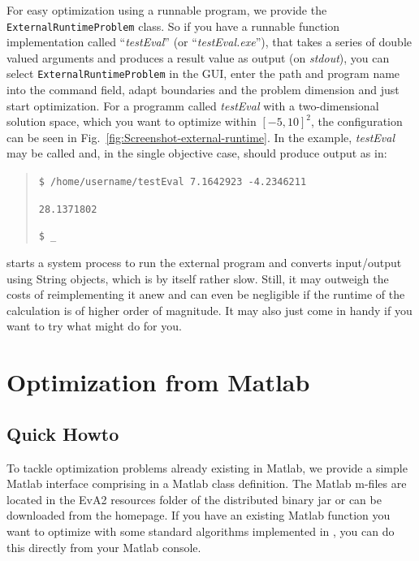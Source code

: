 For easy optimization using a runnable program, we provide the \texttt{ExternalRuntimeProblem}
class. So if you have a runnable function implementation called ``\emph{testEval}''
(or ``\emph{testEval.exe}''), that takes a series of double valued
arguments and produces a result value as output (on \textit{stdout}),
you can select \texttt{ExternalRuntimeProblem} in the GUI, enter the
path and program name into the command field, adapt boundaries and
the problem dimension and just start optimization. For a programm
called \textit{testEval} with a two-dimensional solution space, which
you want to optimize within $[-5,10]^{2}$, the configuration can
be seen in Fig.~\ref{fig:Screenshot-external-runtime}. In the example,
\textit{testEval} may be called and, in the single objective case,
should produce output as in:
\begin{quotation}
\begin{flushleft}
\texttt{\$ /home/username/testEval 7.1642923 -4.2346211}
\par\end{flushleft}

\begin{flushleft}
\texttt{28.1371802}
\par\end{flushleft}

\begin{flushleft}
\texttt{\$ \_}
\par\end{flushleft}
\end{quotation}
 starts a system process to run the external program and
converts input/output using String objects, which is by itself rather
slow. Still, it may outweigh the costs of reimplementing it anew and
can even be negligible if the runtime of the calculation is of higher
order of magnitude. It may also just come in handy if you want to
try what  might do for you.


\section{Optimization from Matlab\label{sub:Optimization-from-Matlab}}


\subsection{Quick Howto\label{sub:JEInterface-Quick-Intro}}

To tackle optimization problems already existing in Matlab, we provide
a simple Matlab interface comprising in a Matlab class definition.
The Matlab m-files are located in the EvA2 resources folder of the
distributed binary jar or can be downloaded from the homepage. If
you have an existing Matlab function you want to optimize with some
standard algorithms implemented in , you can do this directly
from your Matlab console. 

